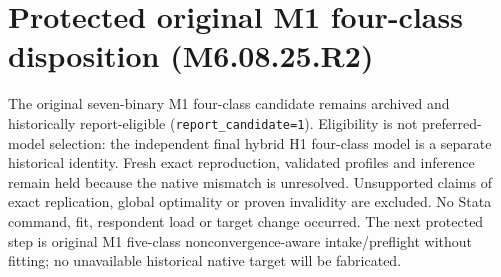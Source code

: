 \documentclass[11pt,a4paper]{article}
\begin{document}
\section*{Protected original M1 four-class disposition (M6.08.25.R2)}
The original seven-binary M1 four-class candidate remains archived and
historically report-eligible (\texttt{report\_candidate=1}). Eligibility is not
preferred-model selection: the independent final hybrid H1 four-class model is
a separate historical identity. Fresh exact reproduction, validated profiles
and inference remain held because the native mismatch is unresolved. Unsupported
claims of exact replication, global optimality or proven invalidity are excluded.
No Stata command, fit, respondent load or target change occurred. The next
protected step is original M1 five-class nonconvergence-aware intake/preflight
without fitting; no unavailable historical native target will be fabricated.
\end{document}
